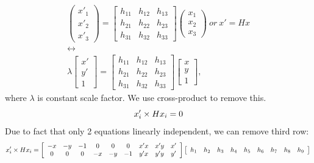 \documentclass[a4paper, twoside, english]{article}
\begin{document}
\begin{equation}
\begin{gathered}		
	\left(
	\begin{array}{ccc}
		x'_1\\
		x'_2\\
		x'_3
	\end{array}
	\right) = 
	\left[
	\begin{array}{ccc}
		h_{11}&h_{12}&h_{13}\\
		h_{21}&h_{22}&h_{23}\\
		h_{31}&h_{32}&h_{33}
	\end{array}
	\right]
	\left(
	\begin{array}{ccc}
		x_1\\
		x_2\\
		x_3
	\end{array}
	\right) 
	\label{eq:Homograph}
	\ or \ 
	x'=Hx \\ \leftrightarrow \\ 
	\lambda \left[
	\begin{array}{ccc}
		x'\\
		y'\\
		1
	\end{array}
	\right] = 
	\left[
	\begin{array}{ccc}
		h_{11}&h_{12}&h_{13}\\
		h_{21}&h_{22}&h_{23}\\
		h_{31}&h_{32}&h_{33}
	\end{array}
	\right]
	\left[
		\begin{array}{ccc}
		x\\
		y\\
		1
	\end{array}
	\right],
\end{gathered}	
\end{equation}
where $\lambda$ is constant scale factor. We use cross-product to remove this.
\begin{equation*}
	x'_i \times Hx_i= 0 \\ 
\end{equation*}
 Due to fact that only 2 equations linearly independent, we can remove third row:
 \begin{equation*}
 	x'_i \times Hx_i= 
 	\left[
 	\begin{array}{ccccccccc}
 		-x & -y & -1 & 0 & 0 & 0 & x'x &x'y & x'\\
 		0 & 0 & 0 & -x & -y & -1 & y'x & y'y & y'
 		
 	\end{array}
 	\right]  
 	\left[
 	\begin{array}{ccccccccc}
 		h_1 & h_2 & h_3 & h_4 & h_5 & h_6 & h_7 & h_8 & h_9 		
 	\end{array}
 	\right]\\ 
\end{equation*}
\end{document}

